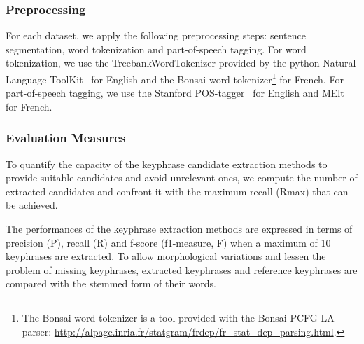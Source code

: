     \subsubsection{Preprocessing}
    \label{subsubsec:preprocessing}
      For each dataset, we apply the following preprocessing steps: sentence
      segmentation, word tokenization and part-of-speech tagging. For word
      tokenization, we use the TreebankWordTokenizer provided by the python
      Natural Language ToolKit~\cite{bird2009nltk} for English and the Bonsai
      word tokenizer\footnote{The Bonsai word tokenizer is a tool provided with
      the Bonsai PCFG-LA parser:
      \url{http://alpage.inria.fr/statgram/frdep/fr_stat_dep_parsing.html}.} for
      French. For part-of-speech tagging, we use the Stanford
      POS-tagger~\cite{toutanova2003stanfordpostagger} for English and
      MElt~\cite{denis2009melt} for French.

    \subsubsection{Evaluation Measures}
    \label{subsubsec:keyphrase_extraction_evaluation_measures}
      To quantify the capacity of the keyphrase candidate extraction methods to
      provide suitable candidates and avoid unrelevant ones, we compute the
      number of extracted candidates and confront it with the maximum recall
      (Rmax) that can be achieved.

      The performances of the keyphrase extraction methods are expressed in
      terms of precision (P), recall (R) and f-score (f1-measure, F) when a
      maximum of 10 keyphrases are extracted. To allow morphological variations
      and lessen the problem of missing keyphrases, extracted keyphrases and
      reference keyphrases are compared with the stemmed form of their words.


